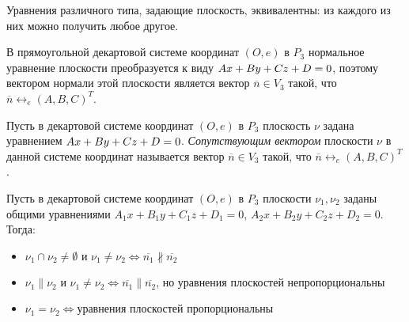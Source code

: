 \begin{note}
	Уравнения различного типа, задающие плоскость, эквивалентны: из каждого из них можно получить любое другое.
\end{note}

\begin{note}
	В прямоугольной декартовой системе координат $(O, e)$ в $P_3$ нормальное уравнение плоскости преобразуется к виду $Ax+By+Cz\hm{+}D=0$, поэтому вектором нормали этой плоскости является вектор $\overline{n} \in V_3$ такой, что $\overline{n} \leftrightarrow_{e} (A, B, C)^T$.
\end{note}

\begin{definition}
	Пусть в декартовой системе координат $(O, e)$ в $P_3$ плоскость $\nu$ задана уравнением $Ax+By+Cz\hm{+}D=0$. \textit{Сопутствующим вектором} плоскости $\nu$ в данной системе координат называется вектор $\overline n \in V_3$ такой, что $\overline{n} \leftrightarrow_{e} (A, B, C)^T$.
\end{definition}

\begin{proposition}
	Пусть в декартовой системе координат $(O, e)$ в $P_3$ плоскости $\nu_1, \nu_2$ заданы общими уравнениями $A_1x+B_1y+C_1z+D_1 = 0$, $A_2x+B_2y+C_2z+D_2 = 0$. Тогда:
	\begin{itemize}
		\item $\nu_1 \cap \nu_2 \ne \emptyset$ и $\nu_1 \ne \nu_2 \Leftrightarrow \overline{n_1} \nparallel \overline{n_2}$
		\item $\nu_1 \parallel \nu_2 \text{ и } \nu_1 \ne \nu_2 \Leftrightarrow \overline{n_1} \parallel \overline{n_2} \text{, но уравнения плоскостей непропорциональны}$
		\item $\nu_1 = \nu_2 \Leftrightarrow \text{уравнения плоскостей пропорциональны}$
	\end{itemize}
\end{proposition}

